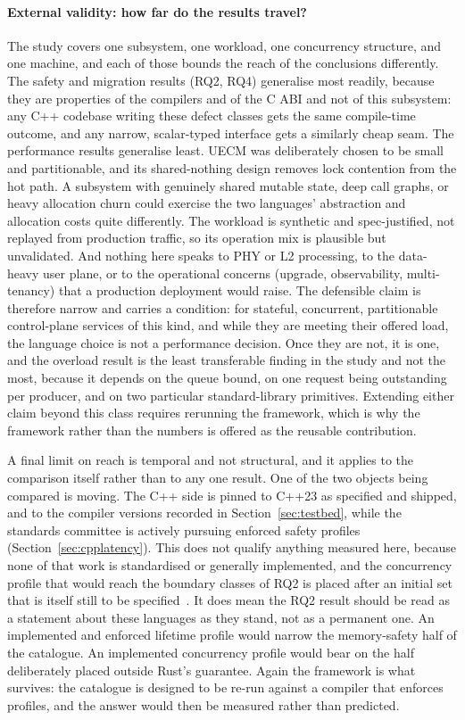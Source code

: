 \documentclass[english,twoside,openright,a4paper,censored,csm,software-track-2020]{HYthesisML}
\begin{document}
\paragraph{External validity: how far do the results travel?}
The study covers one subsystem, one workload, one concurrency structure, and one machine, and
each of those bounds the reach of the conclusions differently. The safety and migration
results (RQ2, RQ4) generalise most readily, because they are properties of the compilers and
of the C ABI and not of this subsystem: any C++ codebase writing these defect classes gets
the same compile-time outcome, and any narrow, scalar-typed interface gets a similarly cheap
seam. The performance results generalise least. UECM was deliberately chosen to be small and
partitionable, and its shared-nothing design removes lock contention from the hot path.
A subsystem with genuinely shared mutable state, deep call graphs, or heavy allocation
churn could exercise the two languages' abstraction and allocation costs quite differently. The
workload is synthetic and spec-justified, not replayed from production traffic, so its
operation mix is plausible but unvalidated. And nothing here speaks to PHY or L2
processing, to the data-heavy user plane, or to the operational concerns (upgrade,
observability, multi-tenancy) that a production deployment would raise. The defensible claim
is therefore narrow and carries a condition: for stateful, concurrent, partitionable
control-plane services of this kind, and while they are meeting their offered load, the language
choice is not a performance decision. Once they are not, it is one, and the overload result is
the least transferable finding in the study and not the most, because it depends on the queue
bound, on one request being outstanding per producer, and on two particular standard-library
primitives. Extending either claim beyond this class requires rerunning the framework, which is
why the framework rather than the numbers is offered as the reusable contribution.

A final limit on reach is temporal and not structural, and it applies to the comparison
itself rather than to any one result. One of the two objects being compared is moving. The C++
side is pinned to C++23 as specified and shipped, and to the compiler versions recorded in
Section~\ref{sec:testbed}, while the standards committee is actively pursuing enforced safety
profiles (Section~\ref{sec:cpplatency}). This does not qualify anything measured here, because
none of that work is standardised or generally implemented, and the concurrency profile that
would reach the boundary classes of RQ2 is placed after an initial set that is itself still to be
specified~\cite{vandevoorde2026profiles}. It does mean the RQ2 result should be read as a
statement about these languages as they stand, not as a permanent one. An implemented and
enforced lifetime profile would narrow the memory-safety half of the catalogue. An implemented
concurrency profile would bear on the half deliberately placed outside Rust's guarantee. Again the
framework is what survives: the catalogue is designed to be re-run against
a compiler that enforces profiles, and the answer would then be measured rather than predicted.
\end{document}
